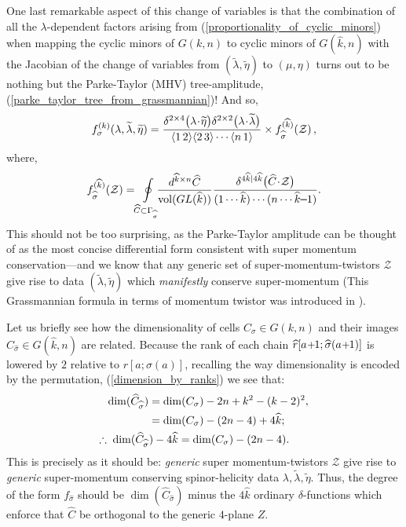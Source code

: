 \documentclass[12pt,hyperref,compress]{JHEP3}
\renewcommand{\hat}{\widehat}
\newcommand{\eq}[1]{\begin{equation}#1\end{equation}}
\newcommand{\eqs}[1]{\begin{equation}\begin{split}#1\end{split}\end{equation}}
\newcommand{\mi}{{\rm\rule[2.4pt]{6pt}{0.65pt}}}
\newcommand{\pl}{\hspace{0.5pt}\text{{\small+}}\hspace{-0.5pt}}
\newcommand{\ab}[1]{\langle #1 \rangle}
\begin{document}
{One last remarkable aspect of this change of variables is that the combination of all the $\lambda$-dependent factors arising from (\ref{proportionality_of_cyclic_minors}) when mapping the cyclic minors of $G(k,n)$ to cyclic minors of $G(\hat{k},n)$ with the Jacobian of the change of variables from $(\widetilde\lambda,\widetilde\eta)$ to $(\mu,\eta)$ turns out to be nothing but the Parke-Taylor (MHV) tree-amplitude, (\ref{parke_taylor_tree_from_grassmannian})! And so,
\vspace{-.2cm}\eq{f_{\sigma}^{(k)}(\lambda,\widetilde \lambda,\widetilde \eta) =\frac{\delta^{2\times4}\big(\lambda\!\cdot\!\widetilde{\eta}\big)\delta^{2\times2}\big(\lambda\!\cdot\!\widetilde{\lambda}\big)}{\ab{1\,2}\ab{2\,3}\cdots\ab{n\,1}} \times f_{\hat{\sigma}}^{(\hat{k})}({\cal Z})\,,\vspace{-.2cm}\label{parke_taylor_jacobian}}
where,
\vspace{-.0cm}\eq{f_{\hat{\sigma}}^{(\hat{k})}({\cal Z})=\!\oint\limits_{\hat{C}\subset\Gamma_{\hat{\sigma}}}\!\!\!\frac{d^{\hat{k} \times n} \hat{C}}{\mathrm{vol}(GL(\hat{k}))}\frac{\delta^{4\hat{k}|4\hat{k}}\big(\hat{C}\!\cdot\!\mathcal{Z}\big)}{(1\cdots \hat{k})\cdots(n\cdots \hat{k}\mi1)}.\vspace{-.2cm}\label{general_on_shell_function_momentum_twistors}}
This should not be too surprising, as the Parke-Taylor amplitude can be thought of as the most concise differential form consistent with super momentum conservation---and we know that any generic set of super-momentum-twistors $\mathcal{Z}$ give rise to data $(\widetilde\lambda,\widetilde\eta)$ which {\it manifestly} conserve super-momentum (This Grassmannian formula in terms of momentum twistor was introduced in \cite{Mason:2009qx}).

Let us briefly see how the dimensionality of cells $C_\sigma\!\in\!G(k,n)$ and their images $\hat{C}_{\hat{\sigma}}\!\in\!G(\hat{k},n)$ are related. Because the rank of each chain $\hat{r}[a\pl1;\hat{\sigma}(a\pl1)]$ is lowered by $2$ relative to $r[a;\sigma(a)]$, recalling the way dimensionality is encoded by the permutation, (\ref{dimension_by_ranks}) we see that:\\[-7pt]
\vspace{-.1cm}\eqs{\dim(\hat{C}_{\hat{\sigma}})&=\dim(C_{\sigma})-2n+k^2-(k-2)^2,\\&=\dim(C_{\sigma})-(2n-4)+4\hat{k};\\\therefore\;\dim(\hat{C}_{\hat{\sigma}})-4\hat{k}\hspace{-0.95cm}&\hspace{0.95cm}=\dim(C_{\sigma})-(2n-4).\vspace{-.2cm}}
This is precisely as it should be: {\it generic} super momentum-twistors $\mathcal{Z}$ give rise to {\it generic} super-momentum conserving spinor-helicity data $\lambda, \widetilde \lambda, \widetilde\eta$. Thus, the degree of the form $f_{\hat{\sigma}}$ should be $\dim(\hat{C}_{\hat{\sigma}})$ minus the $4\hat{k}$ ordinary $\delta$-functions which enforce that $\hat{C}$ be orthogonal to the generic $4$-plane $Z$.

}
\end{document}
